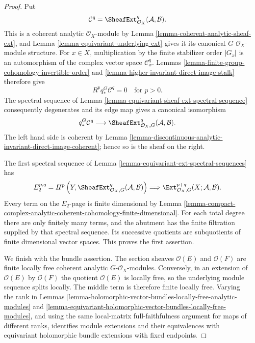 \begin{proof}
Put
$$
\mathcal C^q=
\SheafExt^q_{\mathcal O_X}(\mathcal A,\mathcal B).
$$
This is a coherent analytic $\mathcal O_X$-module by Lemma
\ref{lemma-coherent-analytic-sheaf-ext}, and Lemma
\ref{lemma-equivariant-underlying-ext} gives it its canonical
$G$-$\mathcal O_X$-module structure. For $x\in X$, multiplication by the
finite stabilizer order $|G_x|$ is an automorphism of the complex vector
space $\mathcal C^q_x$. Lemmas
\ref{lemma-finite-group-cohomology-invertible-order} and
\ref{lemma-higher-invariant-direct-image-stalk} therefore give
$$
R^p q_*^G\mathcal C^q=0
\quad\text{for }p>0.
$$
The spectral sequence of Lemma
\ref{lemma-equivariant-sheaf-ext-spectral-sequence} consequently degenerates
and its edge map gives a canonical isomorphism
$$
q_*^G\mathcal C^q
\longrightarrow
\SheafExt^q_{\mathcal O_X,G}(\mathcal A,\mathcal B).
$$
The left hand side is coherent by Lemma
\ref{lemma-discontinuous-analytic-invariant-direct-image-coherent}; hence so
is the sheaf on the right.

The first spectral sequence of Lemma
\ref{lemma-equivariant-ext-spectral-sequences} has
$$
E_2^{p,q}=
H^p\left(Y,
\SheafExt^q_{\mathcal O_X,G}(\mathcal A,\mathcal B)\right)
\Longrightarrow
\Ext^{p+q}_{\mathcal O_X,G}(X;\mathcal A,\mathcal B).
$$
Every term on the $E_2$-page is finite dimensional by Lemma
\ref{lemma-compact-complex-analytic-coherent-cohomology-finite-dimensional}.
For each total degree there are only finitely many terms, and the abutment
has the finite filtration supplied by that spectral sequence. Its successive
quotients are subquotients of finite dimensional vector spaces. This proves
the first assertion.

We finish with the bundle assertion. The section sheaves $\mathcal O(E)$ and
$\mathcal O(F)$ are finite locally free coherent analytic
$G$-$\mathcal O_X$-modules. Conversely, in an extension of
$\mathcal O(E)$ by $\mathcal O(F)$ the quotient $\mathcal O(E)$ is locally
free, so the underlying module sequence splits locally. The middle term is
therefore finite locally free. Varying the rank in Lemmas
\ref{lemma-holomorphic-vector-bundles-locally-free-analytic-modules} and
\ref{lemma-equivariant-holomorphic-vector-bundles-locally-free-modules}, and
using the same local-matrix full-faithfulness argument for maps of different
ranks, identifies module extensions and their equivalences with equivariant
holomorphic bundle extensions with fixed endpoints.


\end{proof}
